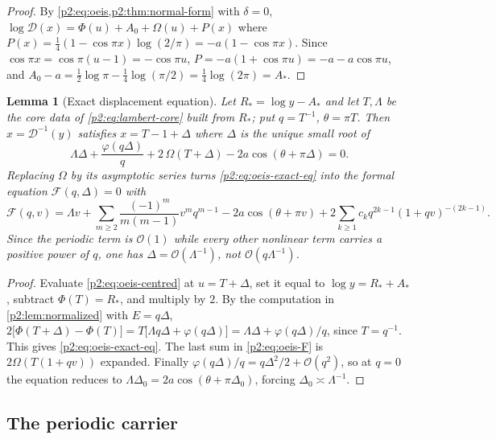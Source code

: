 \documentclass[11pt,a4paper,oneside]{book}
\theoremstyle{plain}
\newtheorem{lemma}[theorem]{Lemma}
\theoremstyle{definition}
\theoremstyle{remark}
\newcommand{\bigO}{\mathcal{O}}
\begin{document}
\begin{proof}
By \cref{p2:eq:oeis,p2:thm:normal-form} with \(\delta=0\),
\(\log\mathscr D(x)=\Phi(u)+A_0+\Omega(u)+P(x)\) where
\(P(x)=\tfrac14(1-\cos\pi x)\log(2/\pi)=-a(1-\cos\pi x)\).  Since
\(\cos\pi x=\cos\pi(u-1)=-\cos\pi u\),
\(P=-a(1+\cos\pi u)=-a-a\cos\pi u\), and
\(A_0-a=\tfrac12\log\pi-\tfrac14\log(\pi/2)=\tfrac14\log(2\pi)=A_*\).
\end{proof}

\begin{lemma}[Exact displacement equation]
\label{p2:lem:oeis-displacement}
Let \(R_*=\log y-A_*\) and let \(T,\Lambda\) be the core data of
\cref{p2:eq:lambert-core} built from \(R_*\); put \(q=T^{-1}\),
\(\theta=\pi T\).  Then \(x=\mathscr D^{-1}(y)\) satisfies \(x=T-1+\Delta\)
where \(\Delta\) is the unique small root of
\begin{equation}
 \Lambda\Delta+\frac{\varphi(q\Delta)}{q}
 +2\,\Omega(T+\Delta)-2a\cos(\theta+\pi\Delta)=0 .
 \label{p2:eq:oeis-exact-eq}
\end{equation}
Replacing \(\Omega\) by its asymptotic series turns \cref{p2:eq:oeis-exact-eq}
into the formal equation \(\mathcal F(q,\Delta)=0\) with
\begin{equation}
 \mathcal F(q,v)=\Lambda v+\sum_{m\ge2}\frac{(-1)^m}{m(m-1)}v^mq^{m-1}
 -2a\cos(\theta+\pi v)
 +2\sum_{k\ge1}c_kq^{2k-1}(1+qv)^{-(2k-1)} .
 \label{p2:eq:oeis-F}
\end{equation}
Since the periodic term is \(\bigO(1)\) while every other nonlinear term
carries a positive power of \(q\), one has \(\Delta=\bigO(\Lambda^{-1})\),
\emph{not} \(\bigO(q\Lambda^{-1})\).
\end{lemma}

\begin{proof}
Evaluate \cref{p2:eq:oeis-centred} at \(u=T+\Delta\), set it equal to
\(\log y=R_*+A_*\), subtract \(\Phi(T)=R_*\), and multiply by \(2\).  By the
computation in \cref{p2:lem:normalized} with \(E=q\Delta\),
\(2\bigl[\Phi(T+\Delta)-\Phi(T)\bigr]
=T\bigl[\Lambda q\Delta+\varphi(q\Delta)\bigr]
=\Lambda\Delta+\varphi(q\Delta)/q\), since \(T=q^{-1}\).  This gives
\cref{p2:eq:oeis-exact-eq}.  The last
sum in \cref{p2:eq:oeis-F} is \(2\Omega(T(1+q v))\) expanded.  Finally
\(\varphi(q\Delta)/q=q\Delta^2/2+\bigO(q^2)\), so at \(q=0\) the equation
reduces to \(\Lambda\Delta_0=2a\cos(\theta+\pi\Delta_0)\), forcing
\(\Delta_0\asymp\Lambda^{-1}\).
\end{proof}

\subsection{The periodic carrier}
\end{document}
